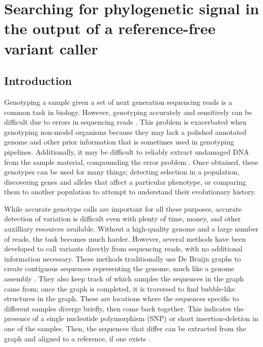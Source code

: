 \chapter{Searching for phylogenetic signal in the output of a reference-free variant caller}
\label{ch:structured}
\newpage
\section{Introduction}

Genotyping a sample given a set of next generation sequencing reads is a common task in biology. However, genotyping accurately and sensitively can be difficult due to errors in sequencing reads \parencite{fox_accuracy_2014, pfeifer_next-generation_2017, wu_estimating_2017}. This problem is exacerbated when genotyping non-model organisms because they may lack a polished annotated genome and other prior information that is sometimes used in genotyping pipelines. Additionally, it may be difficult to reliably extract undamaged DNA from the sample material, compounding the error problem \parencite{da_fonseca_next-generation_2016}. Once obtained, these genotypes can be used for many things; detecting selection in a population, discovering genes and alleles that affect a particular phenotype, or comparing them to another population to attempt to understand their evolutionary history.

While accurate genotype calls are important for all these purposes, accurate detection of variation is difficult even with plenty of time, money, and other auxilliary resources available. Without a high-quality genome and a large number of reads, the task becomes much harder. However, several methods have been developed to call variants directly from sequencing reads, with no additional information necessary. These methods traditionally use De Bruijn graphs to create contiguous sequences representing the genome, much like a genome assembly \parencite{leggett_reference-free_2014}. They also keep track of which samples the sequences in the graph came from; once the graph is completed, it is traversed to find bubble-like structures in the graph. These are locations where the sequences specific to different samples diverge briefly, then come back together. This indicates the presence of a single nucleotide polymorphism (SNP) or short insertion-deletion in one of the samples. Then, the sequences that differ can be extracted from the graph and aligned to a reference, if one exists \parencite{iqbal_novo_2012, uricaru_reference-free_2015}.

